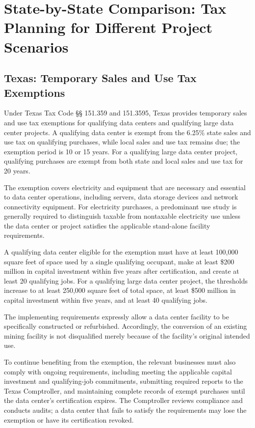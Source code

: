 \section{State-by-State Comparison: Tax Planning for Different Project Scenarios}

\subsection{Texas: Temporary Sales and Use Tax Exemptions}

Under Texas Tax Code \S{}\S{} 151.359 and 151.3595, Texas provides temporary sales and use tax exemptions for qualifying data centers and qualifying large data center projects. A qualifying data center is exempt from the 6.25\% state sales and use tax on qualifying purchases, while local sales and use tax remains due; the exemption period is 10 or 15 years. For a qualifying large data center project, qualifying purchases are exempt from both state and local sales and use tax for 20 years.

The exemption covers electricity and equipment that are necessary and essential to data center operations, including servers, data storage devices and network connectivity equipment. For electricity purchases, a predominant use study is generally required to distinguish taxable from nontaxable electricity use unless the data center or project satisfies the applicable stand-alone facility requirements.



A qualifying data center eligible for the exemption must have at least 100,000 square feet of space used by a single qualifying occupant, make at least \$200 million in capital investment within five years after certification, and create at least 20 qualifying jobs. For a qualifying large data center project, the thresholds increase to at least 250,000 square feet of total space, at least \$500 million in capital investment within five years, and at least 40 qualifying jobs.

The implementing requirements expressly allow a data center facility to be specifically constructed or refurbished. Accordingly, the conversion of an existing mining facility is not disqualified merely because of the facility's original intended use.

To continue benefiting from the exemption, the relevant businesses must also comply with ongoing requirements, including meeting the applicable capital investment and qualifying-job commitments, submitting required reports to the Texas Comptroller, and maintaining complete records of exempt purchases until the data center's certification expires. The Comptroller reviews compliance and conducts audits; a data center that fails to satisfy the requirements may lose the exemption or have its certification revoked.

